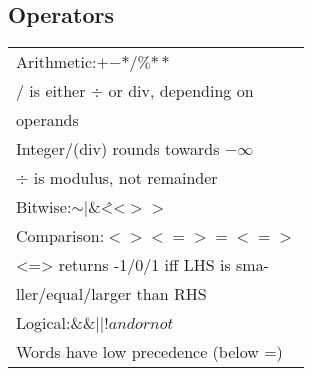 \subsection*{Operators}
\begin{tabular}{ l }
\rowcolor{Gray}
Arithmetic:\hspace{2mm}$+$\hspace{3mm}$-$\hspace{3mm}$*$\hspace{3mm}$/$\hspace{3mm}$\%$\hspace{3mm}$**$ \\
\rowcolor{Gray}
$/$ is either $\div$ or div, depending on \\
\rowcolor{Gray}
operands \\
Integer/(div) rounds towards $-\infty$ \\
$\div$ is modulus, not remainder \\
Bitwise:\hspace{2mm}$\sim$\hspace{3mm}$|$\hspace{3mm}$\&$\hspace{3mm}\^<{}<\hspace{3mm}$>{}>$ \\
\rowcolor{Gray}
Comparison:\hspace{2mm}$<$\hspace{3mm}$>$\hspace{3mm}$<=$\hspace{3mm}$>=$\hspace{3mm}$<=>$\\
\rowcolor{Gray}
<=> returns -1/0/1 iff LHS is sma- \\
\rowcolor{Gray}
ller/equal/larger than RHS \\
Logical:\hspace{2mm}$\&\&$\hspace{3mm}$| |$\hspace{3mm}$!$\hspace{3mm}$and$\hspace{3mm}$or$\hspace{3mm}$not$ \\
Words have low precedence (below =)\\
\end{tabular}
\\

